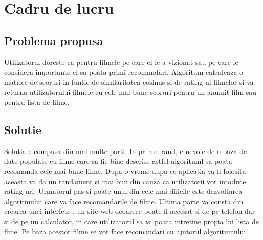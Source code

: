 \chapter{Cadru de lucru }
\section{Problema propusa}
\label{sec:ch3sec1}

\par Utilizatorul doreste ca pentru filmele pe care el le-a vizionat sau pe care le considera importante el sa poata primi recomandari. Algoritum calculeaza o matrice de scoruri in funtie de similaritatea cosinus si de rating ul filmelor si va returna utilizatorului filmele cu  cele mai bune scoruri pentru un anumit film sau pentru lista de filme.

\section{Solutie}
\par Solutia e compusa din mai multe parti. In primul rand, e nevoie de o baza de date populate cu filme care sa fie bine descrise astfel algorituml sa poata recomanda cele mai bune filme. Dupa o vreme dupa ce aplicatia va fi folosita aceasta va da un randament si mai bun din cauza ca utilizatorii vor intoduce rating uri. Urmatorul pas si poate unul din cele mai dificile este dezvoltarea algoritmului care va face recomandarile de filme. Ultima parte va consta din crearea unei interfete , un site web deoarece poate fi accesat si de pe telefon dar si de pe un calculator, in care utilizatorul sa isi poata intretine propia lui lista de flme. Pe baza acestor filme se vor face recomandari cu ajutorul algoritumului.